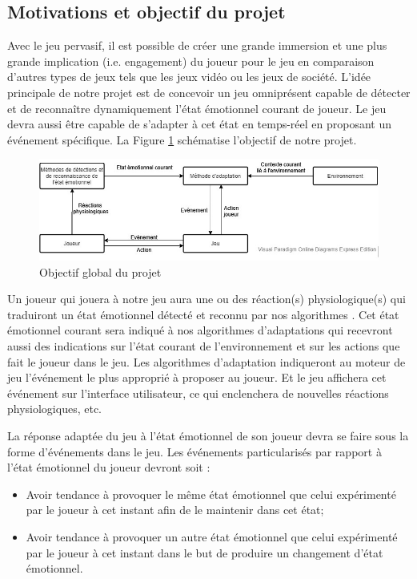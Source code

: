 \documentclass[11pt]{article}
\begin{document}
	\subsection{Motivations et objectif du projet}\label{sec:objectif}
		Avec le jeu pervasif, il est possible de créer une grande immersion et une plus grande implication (i.e. engagement) du joueur pour le jeu en comparaison d'autres types de jeux tels que les jeux vidéo ou les jeux de société.
		L'idée principale de notre projet est de concevoir un jeu omniprésent capable de détecter et de reconnaître dynamiquement l'état émotionnel courant de joueur.
		Le jeu devra aussi être capable de s'adapter à cet état en temps-réel en proposant un événement spécifique.
		La Figure \ref{fig:motivation} schématise l'objectif de notre projet.
		\begin{figure}
			\centering
			\includegraphics[scale=0.75]{../include/motivation.jpg}
			\caption{Objectif global du projet}
			\label{fig:motivation}
		\end{figure}
		Un joueur qui jouera à notre jeu aura une ou des réaction(s) physiologique(s) qui traduiront un état émotionnel détecté et reconnu par nos algorithmes \cite{gal_2019,gal_et_al._2020}.
		Cet état émotionnel courant sera indiqué à nos algorithmes d'adaptations qui recevront aussi des indications sur l'état courant de l'environnement et sur les actions que fait le joueur dans le jeu.
		Les algorithmes d'adaptation indiqueront au moteur de jeu l'événement le plus approprié à proposer au joueur.
		Et le jeu affichera cet événement sur l'interface utilisateur, ce qui enclenchera de nouvelles réactions physiologiques, etc.\par
		La réponse adaptée du jeu à l'état émotionnel de son joueur devra se faire sous la forme d'événements dans le jeu.
		Les événements particularisés par rapport à l'état émotionnel du joueur devront soit :
		\begin{itemize}
			\item Avoir tendance à provoquer le même état émotionnel que celui expérimenté par le joueur à cet instant afin de le maintenir dans cet état;
			\item Avoir tendance à provoquer un autre état émotionnel que celui expérimenté par le joueur à cet instant dans le but de produire un changement d'état émotionnel.
		\end{itemize}
\end{document}
